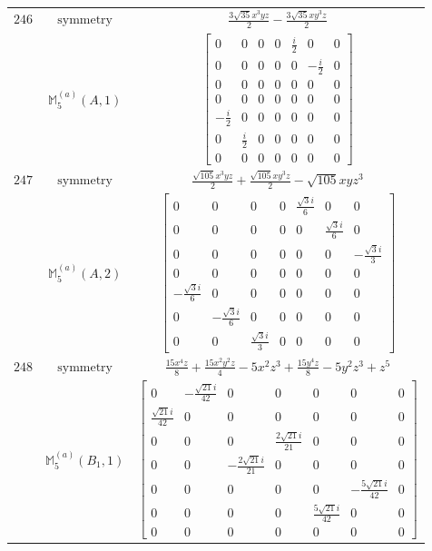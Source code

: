 \documentclass[fleqn,8pt,landscape]{jsarticle}
\begin{document}
\begin{longtable}{ccc}
$ 246 $ & $ \text{symmetry} $ & $ \frac{3 \sqrt{35} x^{3} y z}{2} - \frac{3 \sqrt{35} x y^{3} z}{2} $ \\
$  $ & $ \mathbb{M}_{5}^{(a)}(A,1) $ & $ \begin{bmatrix} 0 & 0 & 0 & 0 & \frac{i}{2} & 0 & 0 \\ 0 & 0 & 0 & 0 & 0 & - \frac{i}{2} & 0 \\ 0 & 0 & 0 & 0 & 0 & 0 & 0 \\ 0 & 0 & 0 & 0 & 0 & 0 & 0 \\ - \frac{i}{2} & 0 & 0 & 0 & 0 & 0 & 0 \\ 0 & \frac{i}{2} & 0 & 0 & 0 & 0 & 0 \\ 0 & 0 & 0 & 0 & 0 & 0 & 0 \end{bmatrix} $ \\ \hline
$ 247 $ & $ \text{symmetry} $ & $ \frac{\sqrt{105} x^{3} y z}{2} + \frac{\sqrt{105} x y^{3} z}{2} - \sqrt{105} x y z^{3} $ \\
$  $ & $ \mathbb{M}_{5}^{(a)}(A,2) $ & $ \begin{bmatrix} 0 & 0 & 0 & 0 & \frac{\sqrt{3} i}{6} & 0 & 0 \\ 0 & 0 & 0 & 0 & 0 & \frac{\sqrt{3} i}{6} & 0 \\ 0 & 0 & 0 & 0 & 0 & 0 & - \frac{\sqrt{3} i}{3} \\ 0 & 0 & 0 & 0 & 0 & 0 & 0 \\ - \frac{\sqrt{3} i}{6} & 0 & 0 & 0 & 0 & 0 & 0 \\ 0 & - \frac{\sqrt{3} i}{6} & 0 & 0 & 0 & 0 & 0 \\ 0 & 0 & \frac{\sqrt{3} i}{3} & 0 & 0 & 0 & 0 \end{bmatrix} $ \\ \hline
$ 248 $ & $ \text{symmetry} $ & $ \frac{15 x^{4} z}{8} + \frac{15 x^{2} y^{2} z}{4} - 5 x^{2} z^{3} + \frac{15 y^{4} z}{8} - 5 y^{2} z^{3} + z^{5} $ \\
$  $ & $ \mathbb{M}_{5}^{(a)}(B_{1},1) $ & $ \begin{bmatrix} 0 & - \frac{\sqrt{21} i}{42} & 0 & 0 & 0 & 0 & 0 \\ \frac{\sqrt{21} i}{42} & 0 & 0 & 0 & 0 & 0 & 0 \\ 0 & 0 & 0 & \frac{2 \sqrt{21} i}{21} & 0 & 0 & 0 \\ 0 & 0 & - \frac{2 \sqrt{21} i}{21} & 0 & 0 & 0 & 0 \\ 0 & 0 & 0 & 0 & 0 & - \frac{5 \sqrt{21} i}{42} & 0 \\ 0 & 0 & 0 & 0 & \frac{5 \sqrt{21} i}{42} & 0 & 0 \\ 0 & 0 & 0 & 0 & 0 & 0 & 0 \end{bmatrix} $ \\ \hline

\end{longtable}
\end{document}

